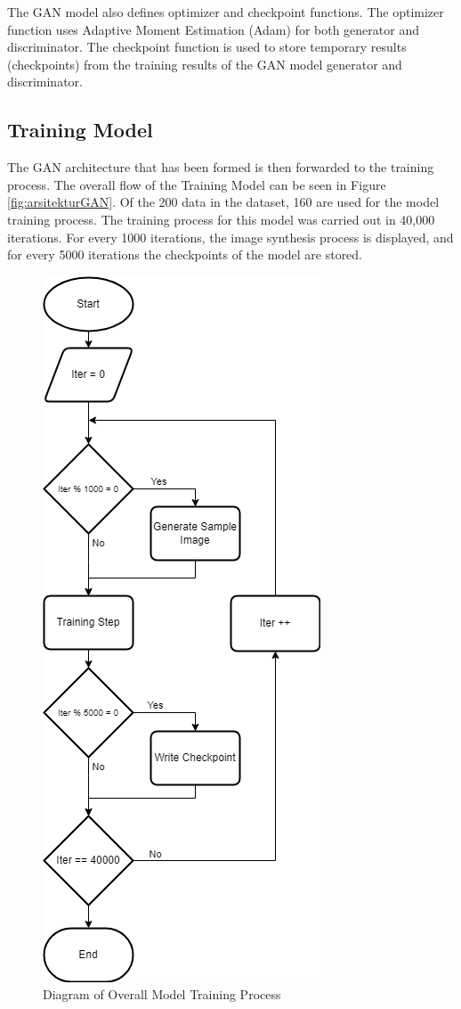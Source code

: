 \documentclass[conference]{IEEEtran}
\begin{document}
The GAN model also defines optimizer and checkpoint functions.
The optimizer function uses Adaptive Moment Estimation (Adam) for both generator and discriminator.
The checkpoint function is used to store temporary results (checkpoints) from the training results of the GAN model generator and discriminator.

\subsection{Training Model}
The GAN architecture that has been formed is then forwarded to the training process.
The overall flow of the Training Model can be seen in Figure \ref{fig:arsitekturGAN}.
Of the 200 data in the dataset, 160 are used for the model training process.
The training process for this model was carried out in 40,000 iterations.
For every 1000 iterations, the image synthesis process is displayed, and for every 5000 iterations the checkpoints of the model are stored.

\begin{figure}[ht]
  \centering
  \includegraphics[scale=0.5]{gambar/Training_model.png}
  \caption{Diagram of Overall Model Training Process}
  \label{fig:training}
\end{figure}
\end{document}
